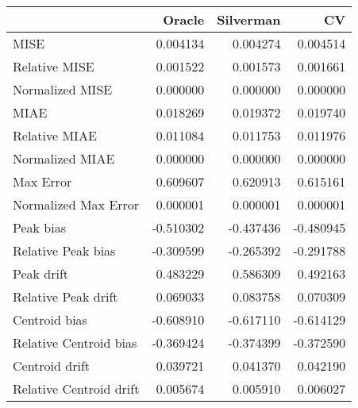\begin{tabular}{lrrr}
  \hline
 & Oracle & Silverman & CV \\ 
  \hline
MISE & 0.004134 & 0.004274 & 0.004514 \\ 
  Relative MISE & 0.001522 & 0.001573 & 0.001661 \\ 
  Normalized MISE & 0.000000 & 0.000000 & 0.000000 \\ 
  MIAE & 0.018269 & 0.019372 & 0.019740 \\ 
  Relative MIAE & 0.011084 & 0.011753 & 0.011976 \\ 
  Normalized MIAE & 0.000000 & 0.000000 & 0.000000 \\ 
  Max Error & 0.609607 & 0.620913 & 0.615161 \\ 
  Normalized Max Error & 0.000001 & 0.000001 & 0.000001 \\ 
  Peak bias & -0.510302 & -0.437436 & -0.480945 \\ 
  Relative Peak bias & -0.309599 & -0.265392 & -0.291788 \\ 
  Peak drift & 0.483229 & 0.586309 & 0.492163 \\ 
  Relative Peak drift & 0.069033 & 0.083758 & 0.070309 \\ 
  Centroid bias & -0.608910 & -0.617110 & -0.614129 \\ 
  Relative Centroid bias & -0.369424 & -0.374399 & -0.372590 \\ 
  Centroid drift & 0.039721 & 0.041370 & 0.042190 \\ 
  Relative Centroid drift & 0.005674 & 0.005910 & 0.006027 \\ 
   \hline
\end{tabular}
